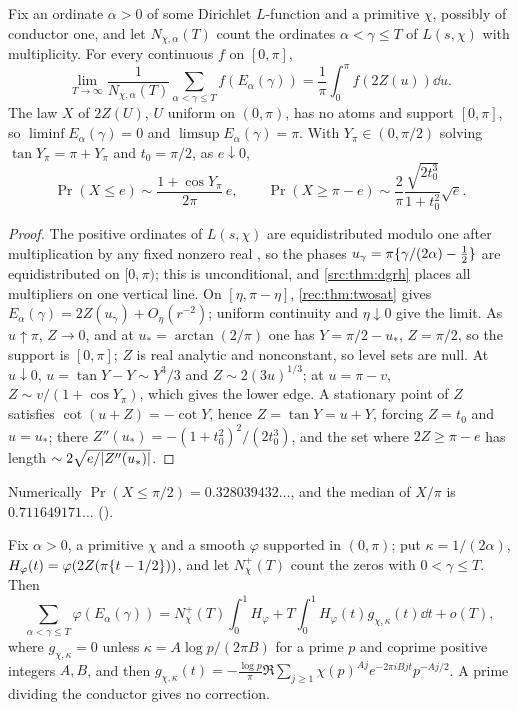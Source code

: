 \begin{theorem}\label{rec:thm:twolaw}
Fix an ordinate $\alpha>0$ of some Dirichlet $L$-function and a primitive $\chi$, possibly of conductor one, and let
$N_{\chi,\alpha}(T)$ count the ordinates $\alpha<\gamma\le T$ of $L(s,\chi)$ with multiplicity. For every continuous $f$ on $[0,\pi]$,
\[
 \lim_{T\to\infty}\frac1{N_{\chi,\alpha}(T)}\sum_{\alpha<\gamma\le T}f(E_\alpha(\gamma))=\frac1\pi\int_0^\pi f(2Z(u))\dd u.
\]
The law $X$ of $2Z(U)$, $U$ uniform on $(0,\pi)$, has no atoms and support $[0,\pi]$, so $\liminf E_\alpha(\gamma)=0$ and
$\limsup E_\alpha(\gamma)=\pi$. With $Y_\pi\in(0,\pi/2)$ solving $\tan Y_\pi=\pi+Y_\pi$ and $t_0=\pi/2$, as $e\downarrow0$,
\[
 \Pr(X\le e)\sim\frac{1+\cos Y_\pi}{2\pi}\,e,\qquad\Pr(X\ge\pi-e)\sim\frac2\pi\frac{\sqrt{2t_0^3}}{1+t_0^2}\sqrt e.
\]
\end{theorem}

\begin{proof}
The positive ordinates of $L(s,\chi)$ are equidistributed modulo one after multiplication by any fixed nonzero
real \cite[Cor.~8]{AkbaryMurty2008Uniform}, so the phases $u_\gamma=\pi\{\gamma/(2\alpha)-\tfrac12\}$ are equidistributed on $[0,\pi)$; this is
unconditional, and \cref{src:thm:dgrh} places all multipliers on one vertical line. On $[\eta,\pi-\eta]$,
\cref{rec:thm:twosat} gives $E_\alpha(\gamma)=2Z(u_\gamma)+O_\eta(r^{-2})$; uniform continuity and $\eta\downarrow0$ give the limit. As $u\uparrow\pi$, $Z\to0$,
and at $u_*=\arctan(2/\pi)$ one has $Y=\pi/2-u_*$, $Z=\pi/2$, so the support is $[0,\pi]$; $Z$ is real analytic and
nonconstant, so level sets are null. At $u\downarrow0$, $u=\tan Y-Y\sim Y^3/3$ and $Z\sim2(3u)^{1/3}$; at $u=\pi-v$, $Z\sim v/(1+\cos Y_\pi)$,
which gives the lower edge. A stationary point of $Z$ satisfies $\cot(u+Z)=-\cot Y$, hence $Z=\tan Y=u+Y$, forcing
$Z=t_0$ and $u=u_*$; there $Z''(u_*)=-(1+t_0^2)^2/(2t_0^3)$, and the set where $2Z\ge\pi-e$ has length $\sim2\sqrt{e/\lvert Z''(u_*)\rvert}$.
\end{proof}

Numerically $\Pr(X\le\pi/2)=0.328039432\ldots$, and the median of $X/\pi$ is $0.711649171\ldots$
().

\begin{theorem}\label{rec:thm:twobias}
Fix $\alpha>0$, a primitive $\chi$ and a smooth $\varphi$ supported in $(0,\pi)$; put $\kappa=1/(2\alpha)$, $H_\varphi(t)=\varphi(2Z(\pi\{t-1/2\}))$, and let
$N_\chi^+(T)$ count the zeros with $0<\gamma\le T$. Then
\[
 \sum_{\alpha<\gamma\le T}\varphi(E_\alpha(\gamma))=N_\chi^+(T)\int_0^1H_\varphi+T\int_0^1H_\varphi(t)g_{\chi,\kappa}(t)\dd t+o(T),
\]
where $g_{\chi,\kappa}=0$ unless $\kappa=A\log p/(2\pi B)$ for a prime $p$ and coprime positive integers $A,B$, and then
$g_{\chi,\kappa}(t)=-\frac{\log p}\pi\Re\sum_{j\ge1}\chi(p)^{Aj}e^{-2\pi iBjt}p^{-Aj/2}$. A prime dividing the conductor gives no correction.
\end{theorem}

